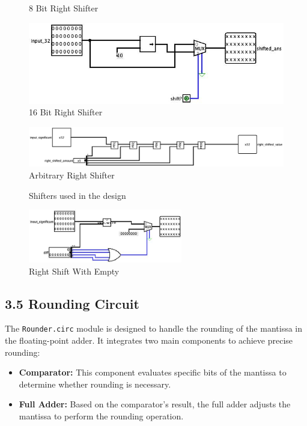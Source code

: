 \documentclass{article}
\begin{document}
\begin{figure}[h!]
\begin{minipage}{0.3\textwidth}
    8 Bit Right Shifter
    \label{fig:8_bit_right_shift}
\end{minipage} 
\hfill
\begin{minipage}{0.3\textwidth}
    \centering
    \includegraphics[width=\linewidth]{16.jpg}
    16 Bit Right Shifter
    \label{fig:16_bit_right_shift}
\end{minipage} 
\hfill
\begin{minipage}{0.3\textwidth}
    \centering
    \includegraphics[width=\linewidth]{a.png}
    Arbitrary Right Shifter
    \label{fig:arbitrary_right_shift}
\end{minipage} 
\caption{Shifters used in the design}
\label{fig:shifters}
\end{figure}

\begin{figure}[h!]
\centering
\includegraphics[width=0.6\textwidth]{r.jpg}  %
\caption{Right Shift With Empty}
\label{fig:right_shift_with_empty}
\end{figure}


\subsection*{3.5 Rounding Circuit}
The \texttt{Rounder.circ} module is designed to handle the rounding of the mantissa in the floating-point adder. It integrates two main components to achieve precise rounding:

\begin{itemize}
    \item \textbf{Comparator:} This component evaluates specific bits of the mantissa to determine whether rounding is necessary.
    \item \textbf{Full Adder:} Based on the comparator's result, the full adder adjusts the mantissa to perform the rounding operation.
\end{itemize}
\end{document}
